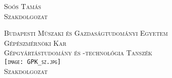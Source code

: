 \begin{titlepage}
	\cleardoublepage{}
	\begin{center}
		\scshape
		\large
		Soós Tamás
		\\
		Szakdolgozat
	\end{center}
	\thispagestyle{empty}
	
	\cleardoublepage{}
	\begin{center}
		\scshape
		\large
		Budapesti Műszaki és Gazdaságtudományi Egyetem
		\\
		Gépészmérnöki Kar
		\\
		Gépgyártástudomány és -technológia Tanszék
		\\
		\vspace{2ex}
		\texttt{[image: GPK\_sz.jpg]}
		\\
		Szakdolgozat	
	\end{center}
	\thispagestyle{empty}
	
	\cleardoublepage{}
	\thispagestyle{empty}
	\newcommand{\HRule}{\rule{\linewidth}{0.4pt}} %
	
	\center{} %
	

\end{titlepage}
